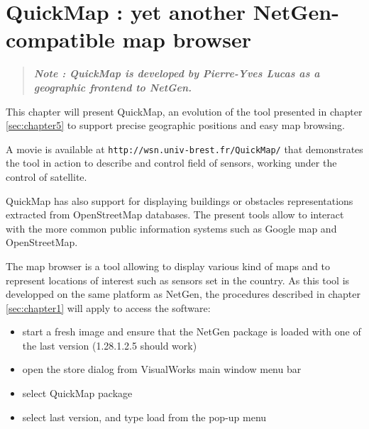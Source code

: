 
\chapter{QuickMap : yet another NetGen-compatible map browser}

\begin{quote}

{\sl \bf{Note :} QuickMap is developed by Pierre-Yves Lucas as a geographic frontend to NetGen.}

\end{quote}

\label{sec:chapter5bis}

This chapter will present QuickMap, an evolution of the tool presented in chapter \ref{sec:chapter5}
to support precise geographic positions and easy map  browsing. 

A movie is available at {\tt http://wsn.univ-brest.fr/QuickMap/} that demonstrates 
the tool in action to describe and control field of sensors,  working
under the control of satellite.

QuickMap has also support for displaying 
buildings or obstacles representations extracted from OpenStreetMap databases. 
The present tools allow to interact with the more common public information systems 
such as Google map and OpenStreetMap. 

The map browser is a tool allowing to display various kind of maps and to represent 
locations of interest such as sensors set in the country. 
As this tool is developped on the same platform as NetGen, the procedures described 
in chapter \ref{sec:chapter1} will apply to access the software: 
\begin{itemize}
\item start a fresh image and ensure that the NetGen package is loaded with one of the last version (1.28.1.2.5 should work)
\item open the store dialog from VisualWorks main window menu bar
\item select QuickMap package 
\item select last version, and type load from the pop-up menu
\end{itemize}

